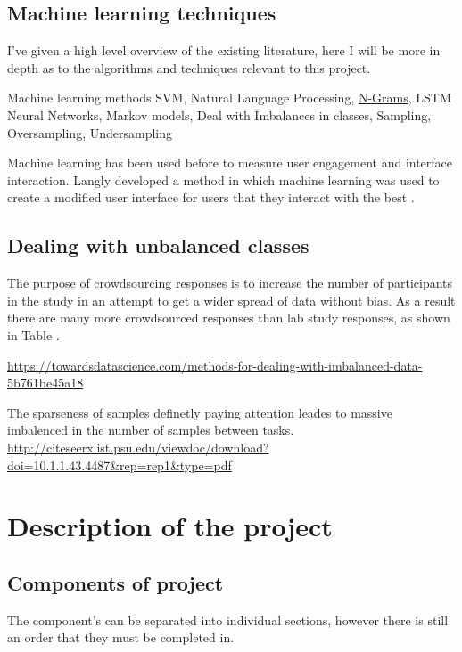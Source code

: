 \documentclass{article}
\begin{document}
\subsection{Machine learning techniques}
I've given a high level overview of the existing literature, here I will be more in depth as to the algorithms and techniques relevant to this project.

Machine learning methods
    SVM,
    Natural Language Processing,
    \underline{N-Grams},
    LSTM Neural Networks,
    Markov models,
Deal with Imbalances in classes,
    Sampling,
    Oversampling, Undersampling

Machine learning has been used before to measure user engagement and interface interaction.
Langly developed a method in which machine learning was used to create a modified user interface for users that they interact with the best \cite{langley1997machine}.


\subsection{Dealing with unbalanced classes}

The purpose of crowdsourcing responses is to increase the number of participants in the study in an attempt to get a wider spread of data without bias.
As a result there are many more crowdsourced responses than lab study responses, as shown in Table .

\url{https://towardsdatascience.com/methods-for-dealing-with-imbalanced-data-5b761be45a18}

The sparseness of samples definetly paying attention leades to massive imbalenced in the number of samples between tasks.
\url{http://citeseerx.ist.psu.edu/viewdoc/download?doi=10.1.1.43.4487&rep=rep1&type=pdf}


\section{Description of the project}

\subsection{Components of project}

The component's can be separated into individual sections, however there is still an order that they must be completed in.
\end{document}
